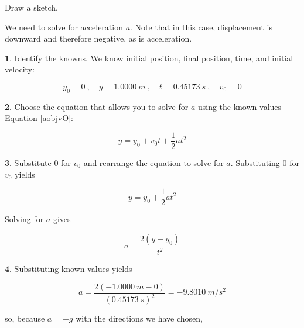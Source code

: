 \documentclass[main-ap-physics.tex]{subfiles}
\begin{document}
\Solution Draw a sketch.

\begin{center}
\end{center}

We need to solve for acceleration $a$. Note that in this case, displacement is downward and therefore negative, as is acceleration.

\vspace{1em}

\textbf{1}. Identify the knowns. We know initial position, final position, time, and initial velocity:

\begin{equation*}
    y_0 = 0\ , \quad
    y = \SI{1.0000}{m}\ , \quad
    t = \SI{0.45173}{s}\ , \quad
    v_0 = 0
\end{equation*}

\textbf{2}. Choose the equation that allows you to solve for $a$ using the known values---Equation \eqref{aobjvO}:

\begin{equation*}
    y = y_0 + v_0 t + \frac{1}{2} a t^2 
\end{equation*}

\textbf{3}. Substitute 0 for $v_0$ and rearrange the equation to solve for $a$. Substituting 0 for $v_0$ yields

\begin{equation*}
    y = y_0 + \frac{1}{2} a t^2
\end{equation*}

Solving for $a$ gives 

\begin{equation*}
    a = \frac{2 \left(y - y_0\right)}{t^2}
\end{equation*}

\textbf{4}. Substituting known values yields

\begin{equation*}
    a = \frac{2 \left(-\SI{1.0000}{m} - 0\right)}{\left(\SI[group-separator=\,]{0.45173}{s}\right)^2} = -\SI{9.8010}{m/s^2}
\end{equation*}

so, because $a = -g$ with the directions we have chosen,
\end{document}
